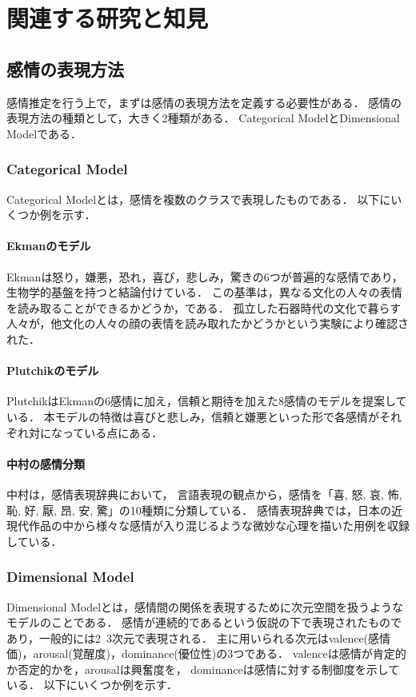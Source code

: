 \chapter{関連する研究と知見}

\section{感情の表現方法}
	感情推定を行う上で，まずは感情の表現方法を定義する必要性がある．
	感情の表現方法の種類として，大きく2種類がある\cite{emotion_analysis_survay}．
	Categorical ModelとDimensional Modelである．

	\subsection{Categorical Model}
		Categorical Modelとは，感情を複数のクラスで表現したものである．
		以下にいくつか例を示す．

		\subsubsection{Ekmanのモデル}
			Ekman\cite{ekman}は怒り，嫌悪，恐れ，喜び，悲しみ，驚きの6つが普遍的な感情であり，生物学的基盤を持つと結論付けている．
			この基準は，異なる文化の人々の表情を読み取ることができるかどうか，である．
			孤立した石器時代の文化で暮らす人々が，他文化の人々の顔の表情を読み取れたかどうかという実験により確認された．

		\subsubsection{Plutchikのモデル}
			Plutchik\cite{plutchik}はEkmanの6感情に加え，信頼と期待を加えた8感情のモデルを提案している．
			本モデルの特徴は喜びと悲しみ，信頼と嫌悪といった形で各感情がそれぞれ対になっている点にある．

		\subsubsection{中村の感情分類}
			中村\cite{kanjou_hyogen_jiten}は，感情表現辞典\cite{kanjou_hyogen_jiten}において，
			言語表現の観点から，感情を「喜, 怒, 哀, 怖, 恥, 好, 厭, 昂, 安, 驚」の10種類に分類している．
			感情表現辞典では，日本の近現代作品の中から様々な感情が入り混じるような微妙な心理を描いた用例を収録している．

	\subsection{Dimensional Model}
		Dimensional Modelとは，感情間の関係を表現するために次元空間を扱うようなモデルのことである．
		感情が連続的であるという仮説の下で表現されたものであり，一般的には2~3次元で表現される．
		主に用いられる次元はvalence(感情価)，arousal(覚醒度)，dominance(優位性)の3つである．
		valenceは感情が肯定的か否定的かを，arousalは興奮度を，
		dominanceは感情に対する制御度を示している\cite{emotion_model_1}\cite{emotion_model_2}．
		以下にいくつか例を示す．

